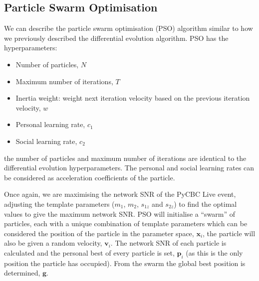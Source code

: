 \subsection{\label{7:sec:pso}Particle Swarm Optimisation}

We can describe the particle swarm optimisation (PSO) algorithm similar to how we previously described the differential evolution algorithm. PSO has the hyperparameters:
%
\begin{itemize}
    \item Number of particles, $N$
    \item Maximum number of iterations, $T$
    \item Inertia weight: weight next iteration velocity based on the previous iteration velocity, $w$
    \item Personal learning rate, $c_{1}$
    \item Social learning rate, $c_{2}$
\end{itemize}
%
the number of particles and maximum number of iterations are identical to the differential evolution hyperparameters. The personal and social learning rates can be considered as acceleration coefficients of the particle.

Once again, we are maximising the network SNR of the PyCBC Live event, adjusting the template parameters ($m_{1}$, $m_{2}$, $s_{1z}$ and $s_{2z}$) to find the optimal values to give the maximum network SNR. PSO will initialise a ``swarm'' of particles, each with a unique combination of template parameters which can be considered the position of the particle in the parameter space, $\mathbf{x}_{i}$, the particle will also be given a random velocity, $\mathbf{v}_{i}$. The network SNR of each particle is calculated and the personal best of every particle is set, $\textbf{p}_{i}$ (as this is the only position the particle has occupied). From the swarm the global best position is determined, $\textbf{g}$.

